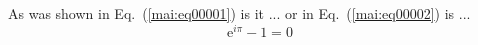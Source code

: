 \documentclass{scrbook}
\begin{document}
  \frontmatter
    
    \tableofcontents
  \mainmatter 
    \setcounter{page}{3} 

    As was shown in Eq.~(\ref{mai:eq00001}) is it
    ... or in Eq.~(\ref{mai:eq00002}) is ...
    \begin{equation}
      \mathrm{e}^{i\pi}-1=0 \label{fyz:eq00001}
    \end{equation}

    
  \backmatter
\end{document}
